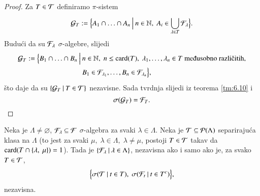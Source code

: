 \begin{proof}
    Za $T \in \mathcal{T}$ definiramo $\pi$-sistem
    \begin{equation*}
        \mathcal{G}_T := \Big\{{A_1 \cap \ldots \cap A_n} \: \Big| \: {n \in \mathbb{N}, \; A_i \in \bigcup\limits_{\lambda \in T}^{}\mathcal{F}_\lambda}\Big\}.
    \end{equation*}
    Budu\' ci da su $\mathcal{F}_\lambda$ $\sigma$-algebre, slijedi
    \begin{align*}
        \famG_T := \Big\{B_1 \cap \ldots \cap B_n \: \Big| \: &n \in \nat, \; n \leq \card{T}, \; \lambda_1, \ldots, \lambda_n \in T \textnormal{ me\dj usobno razli\v citih},\\ &B_1 \in \famF_{\lambda_1},\ldots, B_n \in \famF_{\lambda_n} \Big\},
    \end{align*}
    \v sto daje da su $\{{\mathcal{G}_T} \: | \: {T \in \mathcal{T}}\}$ nezavisne.
    Sada tvrdnja slijedi iz teorema \ref{tm:6.10} i
    \begin{equation*}
        \sigma({\mathcal{G}_T}) = \mathcal{F}_T.
    \end{equation*}
\end{proof}

\begin{prop}    \label{prop:6.12}
    Neka je $\Lambda \neq \varnothing$, $\mathcal{F}_\lambda \subseteq \mathcal{F}$ $\sigma$-algebra za svaki $\lambda \in \Lambda$.
    Neka je $\mathcal{T} \subseteq \mathcal{P}({\Lambda})$ separiraju\' ca klasa na $\Lambda$ (to jest za svaki $\mu, \; \lambda \in \Lambda, \; \lambda \neq \mu$, postoji $T \in \mathcal{T}$ takav da $\mathrm{card}({T \cap \{\lambda, \; \mu\}}) = 1$).
    Tada je $\{{\mathcal{F}_\lambda} \: | \: {\lambda \in \Lambda}\}$, nezavisna ako i samo ako je, za svako $T \in \mathcal{T}$,
    \begin{equation*}
        \Big\{ \sigma({\mathcal{T}} \: | \: {t \in T}), \; \sigma({\mathcal{F}_t} \: | \: {t \in T^c}) \Big\},
    \end{equation*}
    nezavisna.
\end{prop}

